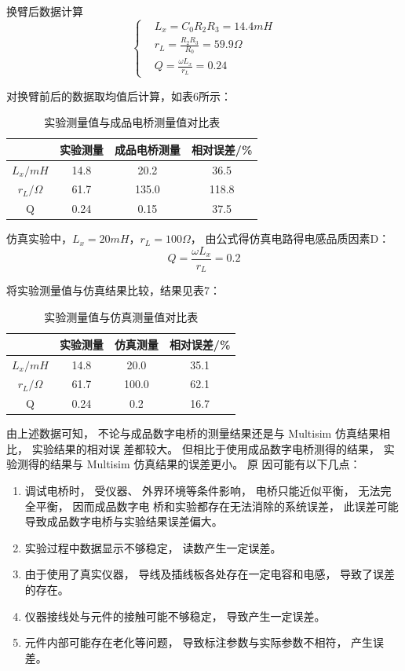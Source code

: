 \documentclass[10pt,a4paper,twocolumn,twoside,UTF8]{ctexart}
\begin{document}
换臂后数据计算
\[\left\{%
\begin{aligned}
&L_x=C_0 R_2 R_3=14.4 mH\\
&r_L=\frac{R_2 R_3}{R_0}=59.9\Omega\\
&Q=\frac{\omega L_x}{r_L}=0.24
\end{aligned}
\right.
\]

对换臂前后的数据取均值后计算，如表6所示：
\begin{table}[!h]
	\centering
	  \begin{tabular}{cccc}
	  \toprule
	     & 实验测量 & 成品电桥测量 & 相对误差/\% \\
	  \midrule
	  $L_x/mH$   & 14.8  & 20.2   & 36.5 \\
	  $r_L/\Omega$  & 61.7   & 135.0   & 118.8 \\
	  Q  & 0.24   & 0.15   & 37.5 \\
	  \bottomrule
	  \end{tabular}%
	\caption{实验测量值与成品电桥测量值对比表}
	\label{tab:6}%
  \end{table}%

仿真实验中，$L_x=20 mH$，$r_L=100\Omega$，
由公式得仿真电路得电感品质因素D：
\begin{equation*}
	Q=\frac{\omega L_x}{r_L}=0.2
\end{equation*}

将实验测量值与仿真结果比较，结果见表7：
\begin{table}[!h]
	\centering
	  \begin{tabular}{cccc}
	  \toprule
	     & 实验测量 & 仿真测量 & 相对误差/\% \\
	  \midrule
	  $L_x/mH$   & 14.8  & 20.0   & 35.1 \\
	  $r_L/\Omega$  & 61.7   & 100.0  & 62.1 \\
	  Q  & 0.24   & 0.2   & 16.7 \\
	  \bottomrule
	  \end{tabular}%
	\caption{实验测量值与仿真测量值对比表}
	\label{tab:7}%
  \end{table}%




  由上述数据可知， 不论与成品数字电桥的测量结果还是与 Multisim 仿真结果相比， 实验结果的相对误
差都较大。 但相比于使用成品数字电桥测得的结果， 实验测得的结果与 Multisim 仿真结果的误差更小。 原
因可能有以下几点：
\begin{enumerate}
	\item 调试电桥时， 受仪器、 外界环境等条件影响， 电桥只能近似平衡， 无法完全平衡， 因而成品数字电
桥和实验都存在无法消除的系统误差， 此误差可能导致成品数字电桥与实验结果误差偏大。
\item  实验过程中数据显示不够稳定， 读数产生一定误差。
\item  由于使用了真实仪器， 导线及插线板各处存在一定电容和电感， 导致了误差的存在。
\item  仪器接线处与元件的接触可能不够稳定， 导致产生一定误差。
\item  元件内部可能存在老化等问题， 导致标注参数与实际参数不相符， 产生误差。
\end{enumerate}
\end{document}
